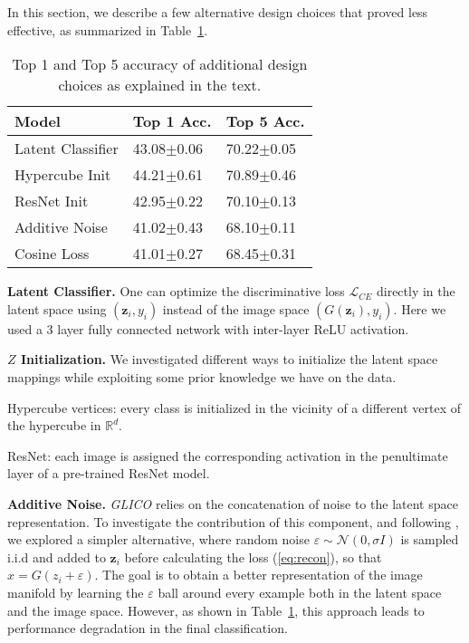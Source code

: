 \documentclass[a4paper,conference]{IEEEtran}
\newcommand{\bz}{{\mathbf z}}
\begin{document}
In this section, we describe a few alternative design choices that proved less effective, as summarized in Table~\ref{tab:alternatives}.

\begin{table}[htbp]
	\centering
	\caption{Top 1 and Top 5 accuracy of additional design choices as explained in the text. 
		\label{tab:alternatives}}
	\begin{tabular}{l|ll}
		Model             & Top 1 Acc.     & Top 5 Acc.     \\
		\toprule
		Latent Classifier & 43.08$\pm$0.06 & 70.22$\pm$0.05 \\
		Hypercube Init    & 44.21$\pm$0.61 & 70.89$\pm$0.46 \\
		ResNet Init       & 42.95$\pm$0.22 & 70.10$\pm$0.13 \\
Additive Noise    & 41.02$\pm$0.43 & 68.10$\pm$0.11 \\
Cosine Loss       & 41.01$\pm$0.27 & 68.45$\pm$0.31 \\
										
		\bottomrule
	\end{tabular}
		
\end{table}

\textbf{Latent Classifier.} One can optimize the discriminative loss $\mathcal{L}_{CE}$ directly in the latent space using $(\bz_i,y_i)$ instead of the image space  $(G(\bz_i),y_i)$. Here we used a 3 layer fully connected network with inter-layer ReLU activation.

\textbf{$Z$ Initialization.} We investigated different ways to initialize the latent space mappings while exploiting some prior knowledge we have on the data. \begin{enumerate*}[label={\roman*)},font={\color{black}\bfseries}]
\item Hypercube vertices: every class is initialized in the vicinity of a different vertex of the hypercube in ${\mathbb R}^{d}$. \item ResNet: each image is assigned the corresponding activation in the penultimate layer of a pre-trained ResNet model.\end{enumerate*}


\textbf{Additive Noise.} \textit{GLICO} relies on the concatenation of noise to the latent space representation. To investigate the contribution of this component, and following \cite{noise2noise}, we explored a simpler alternative, where random noise $\varepsilon \sim \mathcal{N}(0,\sigma I)$ is sampled i.i.d and added to $\bz_i$ before calculating the loss (\ref{eq:recon}), so that $\hat{x}=G(z_i+\varepsilon)$. The goal is to obtain a better representation of the image manifold by learning the $\varepsilon$ ball around every example both in the latent space and the image space. However, as shown in Table~\ref{tab:alternatives}, this approach leads to performance degradation in the final classification. 
\end{document}
